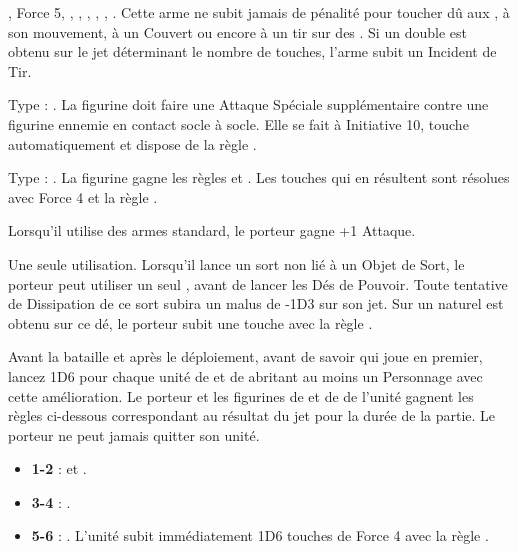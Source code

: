\begin{multicols}{2}
\nopricelistitem{\naphthathrower} , Force 5,  \flamingattacks{}, \magicalattacks{}, , \volatile{}, \reload{}, .\vspace{2pt}\newline
Cette arme ne subit jamais de pénalité pour toucher dû aux \multipleshots{}, à son mouvement, à un Couvert ou encore à un tir sur des \skirmishers{}. Si un double est obtenu sur le jet déterminant le nombre de touches, l'arme subit un Incident de Tir.

\endpricelist

\subtitle{Armes de Corps à Corps}

\startpricelist

\nopricelistitem{\plagueflail} Type : \flail{}. La figurine doit faire une Attaque Spéciale supplémentaire contre une figurine ennemie en contact socle à socle. Elle se fait à Initiative 10, touche automatiquement et dispose de la règle \toxicattacks{}.

\nopricelistitem{\meatgrinder} Type : \hw{}. La figurine gagne les règles  et . Les touches qui en résultent sont résolues avec Force 4 et la règle .

\endpricelist

\subtitle{Autres Équipements}

\startpricelist

\nopricelistitem{\tailweapon} Lorsqu'il utilise des armes standard, le porteur gagne +1 Attaque.

\nopricelistitem{\darkshard} Une seule utilisation. Lorsqu'il lance un sort non lié à un Objet de Sort, le porteur peut utiliser un seul \darkshard{}, avant de lancer les Dés de Pouvoir. Toute tentative de Dissipation de ce sort subira un malus de -1D3 sur son jet. Sur un  naturel est obtenu sur ce dé, le porteur subit une touche avec la règle \toxicattacks{}.

\nopricelistitem{\darkshardbrew} Avant la bataille et après le déploiement, avant de savoir qui joue en premier, lancez 1D6 pour chaque unité de \ratsatarms{} et de \verminguard{} abritant au moins un Personnage avec cette amélioration. Le porteur et les figurines de \ratsatarms{} et de \verminguard{} de l'unité gagnent les règles ci-dessous correspondant au résultat du jet pour la durée de la partie. Le porteur ne peut jamais quitter son unité.
\begin{itemize}[label={-}]
\item \textbf{1-2} : \poisonedattacks{} et \stupidity{}.
\item \textbf{3-4} : \thunderouscharge{}.
\item \textbf{5-6} : \lightningreflexes{}. L'unité subit immédiatement 1D6 touches de Force 4 avec la règle .
\end{itemize}

\endpricelist

\end{multicols}

